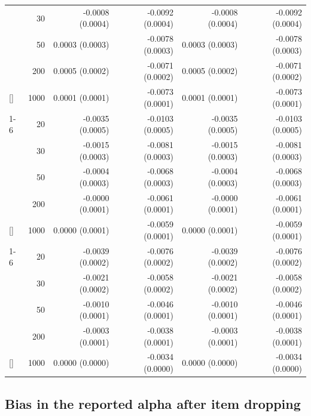 \documentclass[
  nonatbib,
  authoryear,
  preprint]{elsarticle}
\begin{document}
\begin{longtable}[t]{lrrrrr}
\nopagebreak
 & 30 & -0.0008 (0.0004) & -0.0092 (0.0004) & -0.0008 (0.0004) & -0.0092 (0.0004)\\
\nopagebreak
 & 50 & 0.0003 (0.0003) & -0.0078 (0.0003) & 0.0003 (0.0003) & -0.0078 (0.0003)\\
\nopagebreak
 & 200 & 0.0005 (0.0002) & -0.0071 (0.0002) & 0.0005 (0.0002) & -0.0071 (0.0002)\\
\nopagebreak
\multirow[t]{-4}{*}[\normalbaselineskip]{\raggedright\arraybackslash 15} & 1000 & 0.0001 (0.0001) & -0.0073 (0.0001) & 0.0001 (0.0001) & -0.0073 (0.0001)\\
\cmidrule{1-6}\pagebreak[0]
 & 20 & -0.0035 (0.0005) & -0.0103 (0.0005) & -0.0035 (0.0005) & -0.0103 (0.0005)\\
\nopagebreak
 & 30 & -0.0015 (0.0003) & -0.0081 (0.0003) & -0.0015 (0.0003) & -0.0081 (0.0003)\\
\nopagebreak
 & 50 & -0.0004 (0.0003) & -0.0068 (0.0003) & -0.0004 (0.0003) & -0.0068 (0.0003)\\
\nopagebreak
 & 200 & -0.0000 (0.0001) & -0.0061 (0.0001) & -0.0000 (0.0001) & -0.0061 (0.0001)\\
\nopagebreak
\multirow[t]{-4}{*}[\normalbaselineskip]{\raggedright\arraybackslash 20} & 1000 & 0.0000 (0.0001) & -0.0059 (0.0001) & 0.0000 (0.0001) & -0.0059 (0.0001)\\
\cmidrule{1-6}\pagebreak[0]
 & 20 & -0.0039 (0.0002) & -0.0076 (0.0002) & -0.0039 (0.0002) & -0.0076 (0.0002)\\
\nopagebreak
 & 30 & -0.0021 (0.0002) & -0.0058 (0.0002) & -0.0021 (0.0002) & -0.0058 (0.0002)\\
\nopagebreak
 & 50 & -0.0010 (0.0001) & -0.0046 (0.0001) & -0.0010 (0.0001) & -0.0046 (0.0001)\\
\nopagebreak
 & 200 & -0.0003 (0.0001) & -0.0038 (0.0001) & -0.0003 (0.0001) & -0.0038 (0.0001)\\
\nopagebreak
\multirow[t]{-4}{*}[\normalbaselineskip]{\raggedright\arraybackslash 40} & 1000 & 0.0000 (0.0000) & -0.0034 (0.0000) & 0.0000 (0.0000) & -0.0034 (0.0000)\\
\bottomrule

\end{longtable}

\endgroup{}

\subsection{Bias in the reported alpha after item
dropping}\label{bias-in-the-reported-alpha-after-item-dropping}
\end{document}
